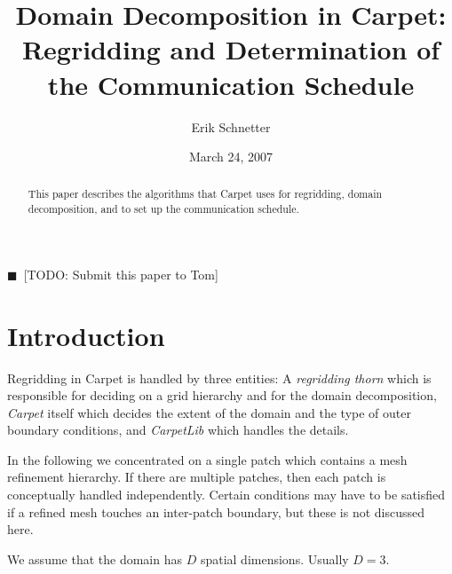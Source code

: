 \documentclass[nofootinbib, twocolumn]{revtex4}
\newcommand{\todo}[1]{{\color{blue}$\blacksquare$~\textsf{[TODO: #1]}}}
\begin{document}
\title{Domain Decomposition in Carpet:\\Regridding and Determination
  of the Communication Schedule}

\author{Erik Schnetter}






\date{March 24, 2007}



\begin{abstract}
  This paper describes the algorithms that Carpet
  \cite{Schnetter-etal-03b, carpetweb} uses for regridding, domain
  decomposition, and to set up the communication schedule.
\end{abstract}

\maketitle

\todo{Submit this paper to Tom}



\section{Introduction}

Regridding in Carpet is handled by three entities: A \emph{regridding
  thorn} which is responsible for deciding on a grid hierarchy and for
the domain decomposition, \emph{Carpet} itself which decides the
extent of the domain and the type of outer boundary conditions, and
\emph{CarpetLib} which handles the details.

In the following we concentrated on a single patch which contains a
mesh refinement hierarchy.  If there are multiple patches, then each
patch is conceptually handled independently.  Certain conditions may
have to be satisfied if a refined mesh touches an inter-patch
boundary, but these is not discussed here.

We assume that the domain has $D$ spatial dimensions.  Usually $D=3$.
\end{document}
